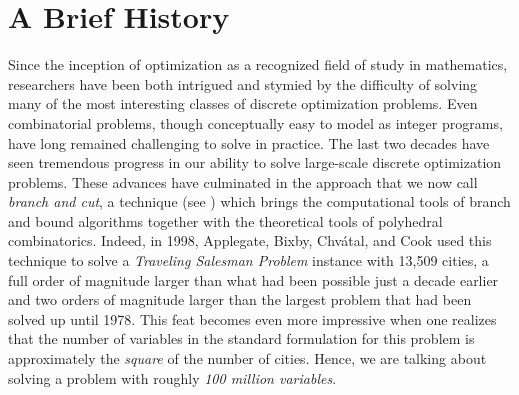 
\section{A Brief History}
\label{history}

Since the inception of optimization as a recognized field of study in
mathematics, researchers have been both intrigued and stymied by the
difficulty of solving many of the most interesting classes of discrete
optimization problems. Even combinatorial problems, though
conceptually easy to model as integer programs, have long remained
challenging to solve in practice. The last two decades have seen
tremendous progress in our ability to solve large-scale discrete
optimization problems. These advances have culminated in the approach
that we now call {\it branch and cut}, a technique (see \cite{Grotschel84cut,padb:branc,hoff:LP}) which brings the computational tools of branch and bound
algorithms together with the theoretical tools of polyhedral
combinatorics. Indeed, in 1998, Applegate, Bixby, Chv\'atal, and Cook
used this technique to solve a {\em Traveling Salesman Problem}
instance with 13,509 cities, a full order of magnitude larger than
what had been possible just a decade earlier \cite{concorde} and two
orders of magnitude larger than the largest problem that had been
solved up until 1978. This feat becomes even more impressive when one
realizes that the number of variables in the standard formulation for
this problem is approximately the {\em square} of the number of
cities. Hence, we are talking about solving a problem with roughly
{\em 100 million variables}.


